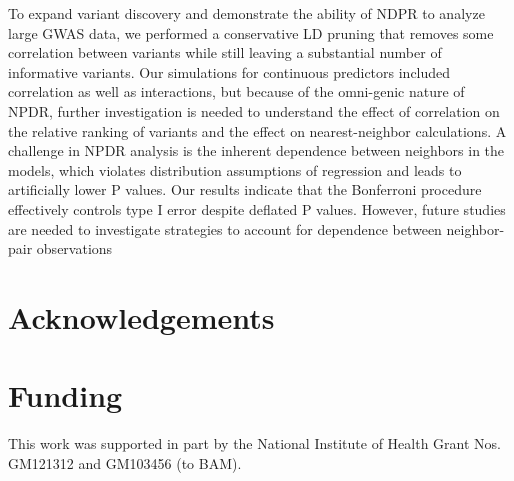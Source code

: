 \documentclass{bioinfo}
\begin{document}
To expand variant discovery and demonstrate the ability of NDPR to analyze large GWAS data, we performed a conservative LD pruning that removes some correlation between variants while still leaving a substantial number of informative variants.
Our simulations for continuous predictors included correlation as well as interactions, but because of the omni-genic nature of NPDR, further investigation is needed to understand the effect of correlation on the relative ranking of variants and the effect on nearest-neighbor calculations.
A challenge in NPDR analysis is the inherent dependence between neighbors in the models, which violates distribution assumptions of regression and leads to artificially lower P values. Our results indicate that the Bonferroni procedure effectively controls type I error despite deflated P values. However, future studies are needed to investigate strategies to account for dependence between neighbor-pair observations

\section*{Acknowledgements}

\section*{Funding}
This work was supported in part by the National Institute of Health Grant Nos. GM121312 and GM103456 (to BAM).



%
%
%
%
%
%
%
%
%
\end{document}
